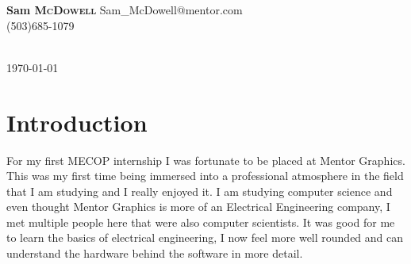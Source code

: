 \documentclass[letterpaper,10pt,notitlepage,fleqn]{article}
\begin{document}
\begin{titlepage}
\begin{minipage}{0.4\textwidth}
\begin{flushright}
            \textbf{Sam \textsc{McDowell}}
            {\small Sam\_McDowell@mentor.com \\
            (503)685-1079}
            \end{flushright}
            \end{minipage}\\[3cm]



{\large \today}\\[3cm] %




\vfill %



\end{titlepage}

\tableofcontents
\newpage

\section{Introduction}
\indent For my first MECOP internship I was fortunate to be placed at Mentor Graphics. This 
was my first time being immersed into a professional atmosphere in the field that 
I am studying and I really enjoyed it. I am studying computer science and even thought 
Mentor Graphics is more of an Electrical Engineering company, I met multiple people 
here that were also computer scientists. It was good for me to learn the basics 
of electrical engineering, I now feel more well rounded and can understand the hardware 
behind the software in more detail.
\end{document}
